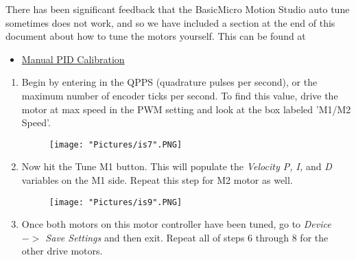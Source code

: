 \documentclass[12pt]{article}
\begin{document}
\begin{enumerate}
	\noindent There has been significant feedback that the BasicMicro Motion Studio auto tune sometimes does not work, and so we have included a section at the end of this document about how to tune the motors yourself. This can be found at 
\begin{itemize}
	\item \hyperref[manual_calibration]{Manual PID Calibration}
\end{itemize}
	\begin{enumerate}
		\item Begin by entering in the QPPS (quadrature pulses per second), or the maximum number of encoder ticks per second. To find this value, drive the motor at max speed in the PWM setting and look at the box labeled 'M1/M2 Speed'.

		\begin{figure}[H]
	 		\centering
			\texttt{[image: "Pictures/is7".PNG]}
	 		\caption{}
		\end{figure}

		\item Now hit the Tune M1 button. This will populate the \textit{Velocity P, I,} and \textit{D} variables on the M1 side. Repeat this step for M2 motor as well.

		\begin{figure}[H]
	 		\centering
			\texttt{[image: "Pictures/is9".PNG]}
	 		\caption{}
		\end{figure}
	
		\item Once both motors on this motor controller have been tuned, go to \textit{Device $->$ Save Settings} and then exit. Repeat all of steps 6 through 8 for the other drive motors.
	\end{enumerate}


\end{enumerate}
\end{document}
